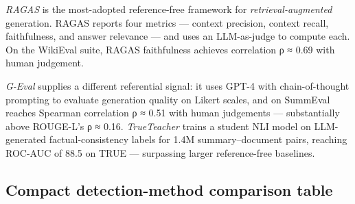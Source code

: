 \documentclass{article}
\begin{document}
\emph{RAGAS} \citep{es2024ragasautomatedeval} is the most-adopted reference-free framework for \emph{retrieval-augmented} generation. RAGAS reports four metrics --- context precision, context recall, faithfulness, and answer relevance --- and uses an LLM-as-judge to compute each. On the WikiEval suite, RAGAS faithfulness achieves correlation ρ ≈ 0.69 with human judgement.

\emph{G-Eval} \citep{liu2023gevalnlgevaluation} supplies a different referential signal: it uses GPT-4 with chain-of-thought prompting to evaluate generation quality on Likert scales, and on SummEval reaches Spearman correlation ρ ≈ 0.51 with human judgements --- substantially above ROUGE-L's ρ ≈ 0.16. \emph{TrueTeacher} \citep{gekhman2023trueteacherlearnin} trains a student NLI model on LLM-generated factual-consistency labels for 1.4M summary--document pairs, reaching ROC-AUC of 88.5 on TRUE --- surpassing larger reference-free baselines.

\subsection{Compact detection-method comparison table}\label{compact-detection-method-comparison-table}
\end{document}
